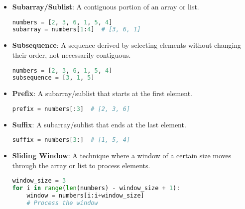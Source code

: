 \begin{itemize}
    \item \textbf{Subarray/Sublist}: A contiguous portion of an array or list.

    \begin{fullwidth}
    \begin{lstlisting}[language=Python, caption=Example of a sublist]
numbers = [2, 3, 6, 1, 5, 4]
subarray = numbers[1:4]  # [3, 6, 1]
    \end{lstlisting}
    \end{fullwidth}

    \item \textbf{Subsequence}: A sequence derived by selecting elements without changing their order, not necessarily contiguous.

    \begin{fullwidth}
    \begin{lstlisting}[language=Python, caption=Example of a subsequence]
numbers = [2, 3, 6, 1, 5, 4]
subsequence = [3, 1, 5]
    \end{lstlisting}
    \end{fullwidth}

    \item \textbf{Prefix}: A subarray/sublist that starts at the first element.

    \begin{fullwidth}
    \begin{lstlisting}[language=Python, caption=Example of a prefix]
prefix = numbers[:3]  # [2, 3, 6]
    \end{lstlisting}
    \end{fullwidth}

    \item \textbf{Suffix}: A subarray/sublist that ends at the last element.

    \begin{fullwidth}
    \begin{lstlisting}[language=Python, caption=Example of a suffix]
suffix = numbers[3:]  # [1, 5, 4]
    \end{lstlisting}
    \end{fullwidth}

    \item \textbf{Sliding Window}: A technique where a window of a certain size moves through the array or list to process elements.

    \begin{fullwidth}
    \begin{lstlisting}[language=Python, caption=Using a sliding window]
window_size = 3
for i in range(len(numbers) - window_size + 1):
    window = numbers[i:i+window_size]
    # Process the window
    \end{lstlisting}
    \end{fullwidth}

\end{itemize}

